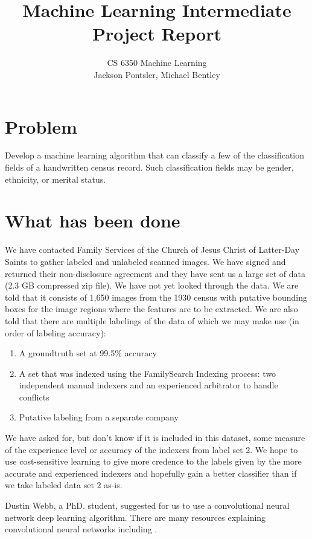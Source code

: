 \documentclass[12pt]{article}
\title{Machine Learning Intermediate Project Report}
\author{
  CS 6350 Machine Learning \\
  Jackson Pontsler, Michael Bentley
  }
\date{}
\begin{document}
\maketitle

\section{Problem}

Develop a machine learning algorithm that can classify a few of the classification fields of a handwritten census record.  Such classification fields may be gender, ethnicity, or merital status.

\section{What has been done}

We have contacted Family Services of the Church of Jesus Christ of Latter-Day Saints to gather labeled and unlabeled scanned images.  We have signed and returned their non-disclosure agreement and they have sent us a large set of data (2.3 GB compressed zip file).  We have not yet looked through the data.  We are told that it consists of 1,650 images from the 1930 census with putative bounding boxes for the image regions where the features are to be extracted.  We are also told that there are multiple labelings of the data of which we may make use (in order of labeling accuracy):
\begin{enumerate}
  \item A groundtruth set at 99.5\% accuracy
  \item A set that was indexed using the FamilySearch Indexing process: two independent manual indexers and an experienced arbitrator to handle conflicts \cite{hansen2013quality}
  \item Putative labeling from a separate company
\end{enumerate}
We have asked for, but don't know if it is included in this dataset, some measure of the experience level or accuracy of the indexers from label set 2.  We hope to use cost-sensitive learning to give more credence to the labels given by the more accurate and experienced indexers and hopefully gain a better classifier than if we take labeled data set 2 as-is.

Dustin Webb, a PhD. student, suggested for us to use a convolutional neural network deep learning algorithm.  There are many resources explaining convolutional neural networks including \cite{Bengio-et-al-2015-Book} \cite{kavukcuoglu2010learning} \cite{krizhevsky2012imagenet}.
\end{document}
